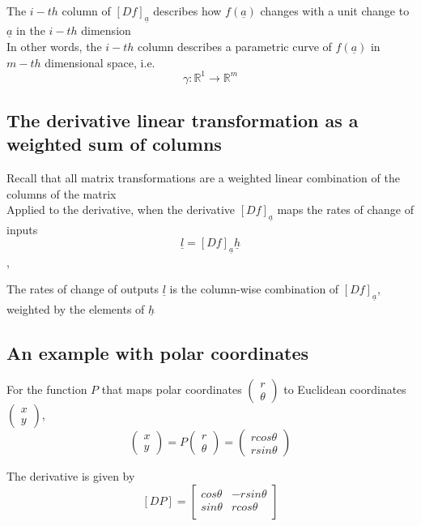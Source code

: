 The $i-th$ column of $[Df]_{ \underline{a}}$ describes how $f( \underline{a})$ changes with a unit change to $ \underline{a} $ in the $i-th$ dimension \\

In other words, the $i-th$ column describes a parametric curve of $f( \underline{a})$ in $m-th$ dimensional space, i.e. \[
  \gamma: \mathbb{R}^1 \to \mathbb{R}^m
\] 

\subsection{The derivative linear transformation as a weighted sum of columns}
Recall that all matrix transformations are a weighted linear combination of the columns of the matrix \\

Applied to the derivative, when the derivative $ [Df]_{ \underline{a}}$ maps the rates of change of inputs \[
   \underline{l} = [Df]_{ \underline{a} } \underline{h}
\],

The rates of change of outputs $ \underline{l}$ is the column-wise combination of $ [Df]_{ \underline{a}}$, weighted by the elements of $ \underline{h}$

\subsection{An example with polar coordinates}

For the function $P$ that maps polar coordinates $ \begin{pmatrix} r \\ \theta \end{pmatrix} $ to Euclidean coordinates $ \begin{pmatrix} x \\ y \end{pmatrix} $, 
\[
  \begin{pmatrix} x \\y \end{pmatrix}  = P \begin{pmatrix} r \\ \theta \end{pmatrix}  = \begin{pmatrix}
    r cos \theta \\
    r sin \theta
  \end{pmatrix}
\] 

The derivative is given by \[
   [DP] = \begin{bmatrix} 
      cos \theta & - r sin \theta \\
      sin \theta &  r cos \theta \\
   \end{bmatrix}
\] 

